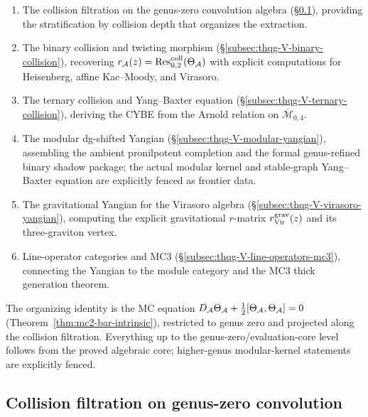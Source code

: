 \begin{enumerate}[label=\textup{(\arabic*)}]
\item The collision filtration on the genus-zero convolution algebra
 (\S\ref{subsec:thqg-V-collision-filtration}), providing the
 stratification by collision depth that organizes the extraction.
\item The binary collision and twisting morphism
 (\S\ref{subsec:thqg-V-binary-collision}), recovering
 $r_{\mathcal{A}}(z) = \operatorname{Res}^{\mathrm{coll}}_{0,2}(\Theta_{\mathcal{A}})$ with explicit
 computations for Heisenberg, affine Kac--Moody, and Virasoro.
\item The ternary collision and Yang--Baxter equation
 (\S\ref{subsec:thqg-V-ternary-collision}), deriving the CYBE from
 the Arnold relation on $\overline{\mathcal{M}}_{0,4}$.
\item The modular dg-shifted Yangian
 (\S\ref{subsec:thqg-V-modular-yangian}), assembling the
 ambient pronilpotent completion and the formal genus-refined binary
 shadow package; the actual modular kernel and stable-graph
 Yang--Baxter equation are explicitly fenced as frontier data.
\item The gravitational Yangian for the Virasoro algebra
 (\S\ref{subsec:thqg-V-virasoro-yangian}), computing the explicit
 gravitational $r$-matrix $r^{\mathrm{grav}}_{\mathrm{Vir}}(z)$ and its
 three-graviton vertex.
\item Line-operator categories and MC3
 (\S\ref{subsec:thqg-V-line-operators-mc3}), connecting the
 Yangian to the module category and the MC3 thick generation theorem.
\end{enumerate}

The organizing identity is the MC equation
$D_{\mathcal{A}}\Theta_{\mathcal{A}} + \tfrac{1}{2}[\Theta_{\mathcal{A}},\Theta_{\mathcal{A}}] = 0$
(Theorem~\ref{thm:mc2-bar-intrinsic}), restricted to
genus zero and projected along the collision filtration.
Everything up to the genus-zero/evaluation-core
level follows from the proved algebraic core; higher-genus modular-kernel statements are explicitly fenced.


%
%

\subsection{Collision filtration on genus-zero convolution}
\label{subsec:thqg-V-collision-filtration}

